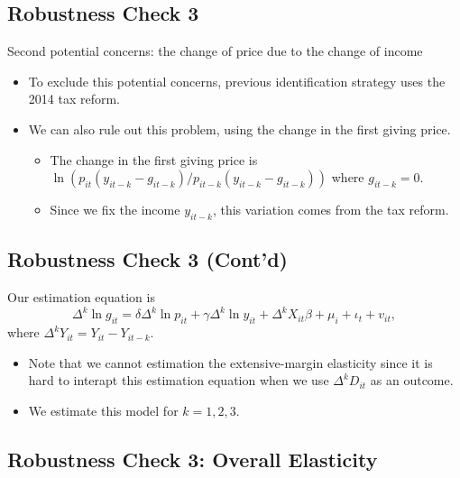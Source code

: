 \documentclass[ review  , 3p ]{elsarticle}
\providecommand{\tightlist}{%
  \setlength{\itemsep}{0pt}\setlength{\parskip}{0pt}}
\begin{document}
  \hypertarget{robustness-check-3}{%
  \subsection{Robustness Check 3}\label{robustness-check-3}}
  
  Second potential concerns: the change of price due to the change of income
  
  \begin{itemize}
  \tightlist
  \item
    To exclude this potential concerns, previous identification strategy uses the 2014 tax reform.
  \item
    We can also rule out this problem, using the change in the first giving price.
  
    \begin{itemize}
    \tightlist
    \item
      The change in the first giving price is \(\ln(p_{it}(y_{it-k} - g_{it-k})/p_{it-k}(y_{it-k} - g_{it-k}))\) where \(g_{it-k} = 0\).
    \item
      Since we fix the income \(y_{it-k}\), this variation comes from the tax reform.
    \end{itemize}
  \end{itemize}
  
  \hypertarget{robustness-check-3-contd}{%
  \subsection{Robustness Check 3 (Cont'd)}\label{robustness-check-3-contd}}
  
  Our estimation equation is
  \[\Delta^k \ln g_{it} = \delta \Delta^k \ln p_{it} + \gamma \Delta^k \ln y_{it} + \Delta^k X_{it} \beta + \mu_i + \iota_t + v_{it},\]
  where \(\Delta^k Y_{it} = Y_{it} - Y_{it-k}\).
  
  \begin{itemize}
  \tightlist
  \item
    Note that we cannot estimation the extensive-margin elasticity since it is hard to interapt this estimation equation when we use \(\Delta^k D_{it}\) as an outcome.
  \item
    We estimate this model for \(k = 1, 2, 3\).
  \end{itemize}
  
  \hypertarget{robustness-check-3-overall-elasticity}{%
  \subsection{Robustness Check 3: Overall Elasticity}\label{robustness-check-3-overall-elasticity}}
  
\end{document}

